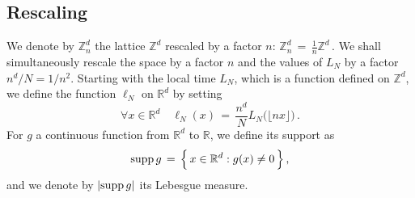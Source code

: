 \documentclass[AHL, Unicode, longabstracts, published]{cedram}
\newcommand*\supp{\text{supp\,}}
\newcommand*\Z {{\mathbb Z}}
\newcommand*\Zd {{\mathbb Z^d}}
\newcommand*\Rd {{\mathbb R^d}}
\newcommand*\Znd {{\mathbb Z_n^d}}
\newcommand*\R{\mathbb{R}}
\let\oldforall\forall
\renewcommand*{\forall}{\mathrel{\oldforall}}
\begin{document}
\subsection{Rescaling}
We denote by $\Znd$ the lattice $\Zd$ rescaled by a factor $n$: $\Znd\,=\,\frac{1}{n}\Z^d\,.$ We shall simultaneously rescale the space by a factor $n$ and the values of $L_N$ by a factor $n^d/N = 1/ n^2$. Starting with the local time $L_N$, which is a function defined on $\Zd$, we define the function $\ell_N$ on $\Rd$ by setting
\begin{equation}\label{D:rescaledLN}
\forall x\in\Rd\quad \ell_N(x)\,=\,
\frac{n^d}{N}{L_N\big(\lfloor nx\rfloor\big)}\,.
\end{equation}
For $g$ a continuous function from $\Rd$ to $\R$, we define its support as
\[
\supp g\,=\,
\Big\{\,x\in \Rd: g(x)\neq 0
\,\Big\}\,,
\]
and we denote by $|\supp g|$ its Lebesgue measure.
\end{document}
